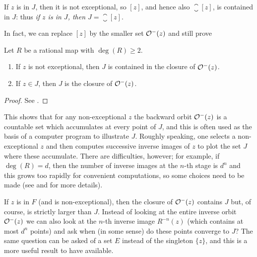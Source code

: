 \begin{remark}[$z$ non-exceptional point and $z \in J \implies J = \closure{[z]}$]
    If $z$ is in $J$, then it is not exceptional, so $[z]$, and hence also
    $\closure{[z]}$, is contained in $J$: thus \emph{if $z$ is in $J$, then $J =
    \closure{[z]}$}. 
\end{remark}

In fact, we can replace $[z]$ by the smaller set $\mathcal{O}^-(z)$ and still prove

\begin{theorem}
    \label{thm:J_contained_in_backwards_orbit_of_z_non_exceptional_and_equal_if_z_in_J}
    Let $R$ be a rational map with $\deg(R) \geq 2$.
    \begin{enumerate}[label=(\roman*)]
        \item If $z$ is not exceptional, then $J$ is contained in the closure of
        $\mathcal{O}^-(z)$.
        \item If $z \in J$, then $J$ is the closure of $\mathcal{O}^-(z)$.
    \end{enumerate}
\end{theorem}
\begin{proof}
    See \cite[71]{Beardon1991}.
\end{proof}

\begin{remark}
    This shows that for any non-exceptional $z$ the backward orbit $\mathcal{O}^-(z)$
    is a countable set which accumulates at every point of $J$, and this is
    often used as the basis of a computer program to illustrate $J$. Roughly
    speaking, one selects a non-exceptional $z$ and then computes successive
    inverse images of $z$ to plot the set $J$ where these accumulate. There are
    difficulties, however; for example, if $\deg(R) = d$, then the number of
    inverse images at the $n$-th stage is $d^n$ and this grows too rapidly for
    convenient computations, so some choices need to be made (see
    \cite{Peitgen1986} and \cite{Barnsley1988} for more details).
\end{remark}

If $z$ is in $F$ (and is non-exceptional), then the closure of $\mathcal{O}^-(z)$
contains $J$ but, of course, is strictly larger than $J$. Instead of looking at
the entire inverse orbit $\mathcal{O}^-(z)$ we can also look at the $n$-th inverse
image $R^{-n}(z)$ (which contains at most $d^n$ points) and ask when (in some
sense) do these points converge to $J$? The same question can be asked of a set
$E$ instead of the singleton $\{z\}$, and this is a more useful result to have
available.


